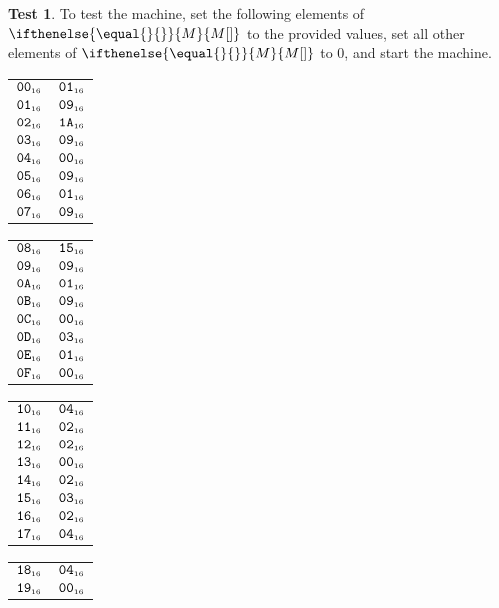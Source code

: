 \documentclass[a4paper,12pt]{article}
\makeatletter
\newcommand{\num}[1]{\texttt{#1}}
\newcommand{\hex}[1]{\num{#1}_{\textup{\tiny 16}}}
\newcommand{\MEM}[1]{\ifthenelse{\equal{#1}{}}{M}{M[#1]}}
\theoremstyle{definition}
\newtheorem{test}{Test}
\newenvironment{memtable}{%
  \begin{trivlist}
    \item
    }{%
    \end{trivlist}}
\newenvironment{memcolumn}{%
  \begin{tabular}{@{}ll@{}}
    \hline}
    {%
    \hline
  \end{tabular}}
\newcommand{\memspace}{\qquad}
\makeatother
\begin{document}
\begin{test}
  To test the machine, set the following elements of $\MEM{}$ to the provided values, set all other elements of $\MEM{}$ to 0, and start the machine.
  \begin{memtable}
    \begin{memcolumn}
      $\hex{00}$ & $\hex{01}$ \\
      $\hex{01}$ & $\hex{09}$ \\
      $\hex{02}$ & $\hex{1A}$ \\
      $\hex{03}$ & $\hex{09}$ \\
      $\hex{04}$ & $\hex{00}$ \\
      $\hex{05}$ & $\hex{09}$ \\
      $\hex{06}$ & $\hex{01}$ \\
      $\hex{07}$ & $\hex{09}$ \\
    \end{memcolumn}
    \memspace
    \begin{memcolumn}
      $\hex{08}$ & $\hex{15}$ \\
      $\hex{09}$ & $\hex{09}$ \\
      $\hex{0A}$ & $\hex{01}$ \\
      $\hex{0B}$ & $\hex{09}$ \\
      $\hex{0C}$ & $\hex{00}$ \\
      $\hex{0D}$ & $\hex{03}$ \\
      $\hex{0E}$ & $\hex{01}$ \\
      $\hex{0F}$ & $\hex{00}$ \\
    \end{memcolumn}
    \memspace
    \begin{memcolumn}
      $\hex{10}$ & $\hex{04}$ \\
      $\hex{11}$ & $\hex{02}$ \\
      $\hex{12}$ & $\hex{02}$ \\
      $\hex{13}$ & $\hex{00}$ \\
      $\hex{14}$ & $\hex{02}$ \\
      $\hex{15}$ & $\hex{03}$ \\
      $\hex{16}$ & $\hex{02}$ \\
      $\hex{17}$ & $\hex{04}$ \\
    \end{memcolumn}
    \memspace
    \begin{memcolumn}
      $\hex{18}$ & $\hex{04}$ \\
      $\hex{19}$ & $\hex{00}$ \\

\end{memcolumn}
\end{memtable}
\end{test}
\end{document}

